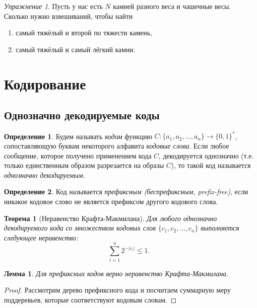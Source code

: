 \documentclass[12pt]{article}
\newcommand{\bits}{\{0,1\}}
\newcommand{\bitstr}{\bits^*}
\newcommand{\seqn}[2]{{#1}_1,{#1}_2,\dotsc,{#1}_{#2}}
\theoremstyle{definition}
\newtheorem{definition}{Определение}[section]
\theoremstyle{plain}
\newtheorem{theorem}{Теорема}[section]
\newtheorem{lemma}{Лемма}[section]
\theoremstyle{remark}
\newtheorem{exercise}{Упражнение}[section]
\begin{document}
\begin{exercise}
    Пусть у нас есть $N$ камней разного веса и чашечные весы.
    Сколько нужно взвешиваний, чтобы найти 
    \begin{enumerate}
        \item самый тяжёлый и второй по тяжести камень,
        \item самый тяжёлый и самый лёгкий камни.
    \end{enumerate}

\end{exercise}

\section{Кодирование}
\subsection{Однозначно декодируемые коды}
\begin{definition}
    Будем называть \emph{кодом} функцию $C:\{\seqn{a}{n}\}\to\bitstr$,
    сопоставляющую буквам некоторого алфавита \emph{кодовые слова}.
    Если любое сообщение, которое получено применением кода $C$, декодируется
    однозначно (т.е. только единственным образом разрезается на образы $C$), 
    то такой код называется \emph{однозначно декодируемым}.
\end{definition}

\begin{definition}
    Код называется \emph{префиксным (беспрефиксным, prefix-free)}, если никакое
    кодовое слово не является префиксом другого кодового слова.
\end{definition}

\begin{theorem}[Неравенство Крафта-Макмилана]\label{thm:mcmill}
    Для любого однозначно декодируемого кода со множеством кодовых слов 
    \(\{\seqn{c}{n}\}\) выполняется следующее неравенство:
    \[
        \sum_{i=1}^{n} 2^{-|c_i|} \le 1.
    \]
\end{theorem}
\begin{lemma}
    Для префиксных кодов верно неравенство Крафта-Макмилана.
\end{lemma}
\begin{proof}
    Рассмотрим дерево префиксного кода и посчитаем суммарную меру поддеревьев,
    которые соответствуют кодовым словам.
\end{proof}
\end{document}
